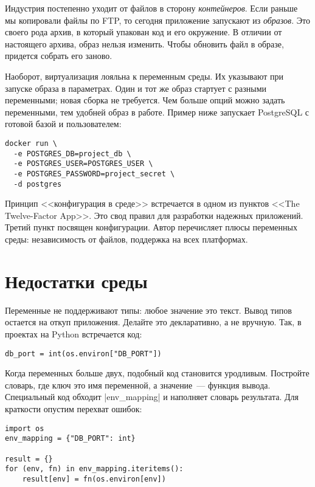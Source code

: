 Индустрия постепенно уходит от файлов в сторону \emph{контейнеров}. Если раньше
мы копировали файлы по FTP, то сегодня приложение запускают из
\emph{образов}. Это своего рода архив, в который упакован код и его окружение. В
отличии от настоящего архива, образ нельзя изменить. Чтобы обновить файл в
образе, придется собрать его заново.

Наоборот, виртуализация лояльна к переменным среды. Их указывают при запуске
образа в параметрах. Один и тот же образ стартует с разными переменными; новая
сборка не требуется. Чем больше опций можно задать переменными, тем удобней
образ в работе. Пример ниже запускает PostgreSQL с готовой базой и
пользователем:

\begin{verbatim}
docker run \
  -e POSTGRES_DB=project_db \
  -e POSTGRES_USER=POSTGRES_USER \
  -e POSTGRES_PASSWORD=project_secret \
  -d postgres
\end{verbatim}

Принцип <<конфигурация в среде>> встречается в одном из пунктов <<The
Twelve-Factor App>>. Это свод правил для
разработки надежных приложений. Третий пункт посвящен конфигурации. Автор
перечисляет плюсы переменных среды: независимость от файлов, поддержка на всех
платформах.

\section{Недостатки среды}

Переменные не поддерживают типы: любое значение это текст. Вывод типов остается
на откуп приложения. Делайте это декларативно, а не вручную. Так, в проектах на
Python встречается код:

\begin{verbatim}
db_port = int(os.environ["DB_PORT"])
\end{verbatim}

Когда переменных больше двух, подобный код становится уродливым. Постройте
словарь, где ключ это имя переменной, а значение~--- функция вывода. Специальный
код обходит \spverb|env_mapping| и наполняет словарь результата. Для краткости
опустим перехват ошибок:

\begin{verbatim}
import os
env_mapping = {"DB_PORT": int}

result = {}
for (env, fn) in env_mapping.iteritems():
    result[env] = fn(os.environ[env])
\end{verbatim}

